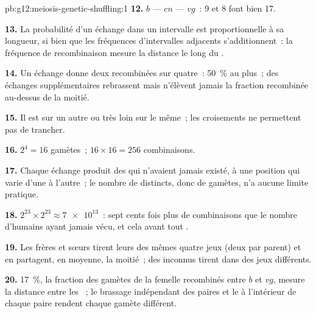 \begin{solution}{pb:g12:meiosis-genetic-shuffling:1}
\textbf{12.} $b$ --- $cn$ --- $vg$~: 9 et 8 font bien 17.

\textbf{13.} La probabilité d'un échange dans un intervalle est
proportionnelle à sa longueur, si bien que les fréquences
d'intervalles adjacents s'additionnent~: la fréquence de recombinaison
mesure la distance le long du .

\textbf{14.} Un échange donne deux  recombinées sur quatre~:
50~\% au plus~; des échanges supplémentaires rebrassent mais n'élèvent
jamais la fraction recombinée au-dessus de la moitié.

\textbf{15.} Il est sur un autre  ou très loin sur le même~;
les croisements ne permettent pas de trancher.

\textbf{16.} $2^4 = 16$ gamètes~; $16 \times 16 = 256$ combinaisons.

\textbf{17.} Chaque échange produit des  qui n'avaient
jamais existé, à une position qui varie d'une  à l'autre~; le
nombre de  distincts, donc de gamètes, n'a aucune limite
pratique.

\textbf{18.} $2^{23} \times 2^{23} \approx \num{7e13}$~: sept cents
fois plus de combinaisons que le nombre d'humains ayant jamais vécu, et
cela avant tout .

\textbf{19.} Les frères et sœurs tirent leurs  des mêmes quatre
jeux (deux par parent) et en partagent, en moyenne, la moitié~; des
inconnus tirent dans des jeux différents.

\textbf{20.} 17~\%, la fraction des gamètes de la femelle recombinés
entre $b$ et $vg$, mesure la distance entre les ~; le brassage
indépendant des paires et le  à l'intérieur de chaque
paire rendent chaque gamète différent.
\end{solution}
